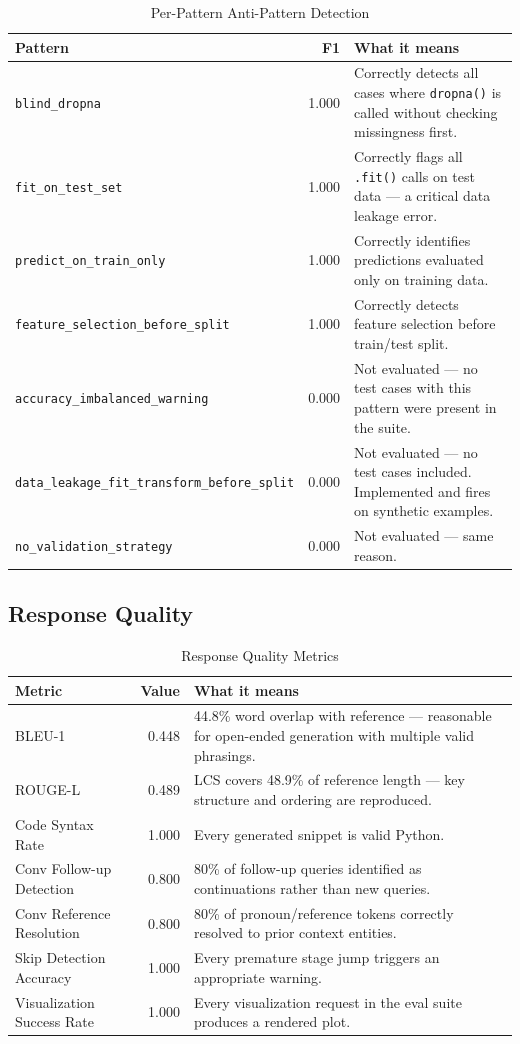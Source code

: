 \documentclass[12pt,a4paper]{article}
\begin{document}
\begin{table}[h!]
\centering
\caption{Per-Pattern Anti-Pattern Detection}
\small
\begin{tabularx}{\textwidth}{lrX}
\toprule
Pattern & F1 & What it means \\
\midrule
\texttt{blind\_dropna} & 1.000 & Correctly detects all cases where \texttt{dropna()} is called without checking missingness first. \\
\texttt{fit\_on\_test\_set} & 1.000 & Correctly flags all \texttt{.fit()} calls on test data --- a critical data leakage error. \\
\texttt{predict\_on\_train\_only} & 1.000 & Correctly identifies predictions evaluated only on training data. \\
\texttt{feature\_selection\_before\_split} & 1.000 & Correctly detects feature selection before train/test split. \\
\texttt{accuracy\_imbalanced\_warning} & 0.000 & Not evaluated --- no test cases with this pattern were present in the suite. \\
\texttt{data\_leakage\_fit\_transform\_before\_split} & 0.000 & Not evaluated --- no test cases included. Implemented and fires on synthetic examples. \\
\texttt{no\_validation\_strategy} & 0.000 & Not evaluated --- same reason. \\
\bottomrule
\end{tabularx}
\end{table}

\subsection{Response Quality}

\begin{table}[h!]
\centering
\caption{Response Quality Metrics}
\small
\begin{tabularx}{\textwidth}{lrX}
\toprule
Metric & Value & What it means \\
\midrule
BLEU-1 & 0.448 & 44.8\% word overlap with reference --- reasonable for open-ended generation with multiple valid phrasings. \\
ROUGE-L & 0.489 & LCS covers 48.9\% of reference length --- key structure and ordering are reproduced. \\
Code Syntax Rate & 1.000 & Every generated snippet is valid Python. \\
Conv Follow-up Detection & 0.800 & 80\% of follow-up queries identified as continuations rather than new queries. \\
Conv Reference Resolution & 0.800 & 80\% of pronoun/reference tokens correctly resolved to prior context entities. \\
Skip Detection Accuracy & 1.000 & Every premature stage jump triggers an appropriate warning. \\
Visualization Success Rate & 1.000 & Every visualization request in the eval suite produces a rendered plot. \\
\bottomrule
\end{tabularx}
\end{table}
\end{document}
